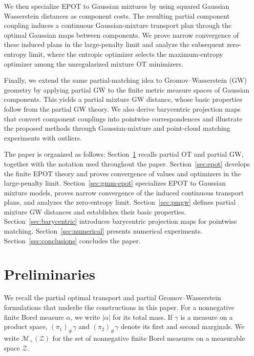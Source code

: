 \documentclass[a4paper,11pt]{article}
\numberwithin{equation}{section}
\newcommand{\MM}{\mathcal{M}}
\newcommand{\Z}{\mathcal{Z}}
\begin{document}
We then specialize EPOT to Gaussian mixtures by using squared Gaussian Wasserstein distances as component costs. The resulting partial component coupling induces a continuous Gaussian-mixture transport plan through the optimal Gaussian maps between components. We prove narrow convergence of these induced plans in the large-penalty limit and analyze the subsequent zero-entropy limit, where the entropic optimizer selects the maximum-entropy optimizer among the unregularized mixture OT minimizers.

Finally, we extend the same partial-matching idea to Gromov--Wasserstein (GW) geometry by applying partial GW to the finite metric measure spaces of Gaussian components. This yields a partial mixture GW distance, whose basic properties follow from the partial GW theory. We also derive barycentric projection maps that convert component couplings into pointwise correspondences and illustrate the proposed methods through Gaussian-mixture and point-cloud matching experiments with outliers.

The paper is organized as follows: Section~\ref{sec:preliminaries} recalls partial OT and partial GW, together with the notation used throughout the paper. Section~\ref{sec:epot} develops the finite EPOT theory and proves convergence of values and optimizers in the large-penalty limit. Section~\ref{sec:gmm-epot} specializes EPOT to Gaussian mixture models, proves narrow convergence of the induced continuous transport plans, and analyzes the zero-entropy limit. Section~\ref{sec:pmgw} defines partial mixture GW distances and establishes their basic properties. Section~\ref{sec:barycentric} introduces barycentric projection maps for pointwise matching. Section~\ref{sec:numerical} presents numerical experiments. Section~\ref{sec:conclusions} concludes the paper.


\section{Preliminaries}\label{sec:preliminaries}

We recall the partial optimal transport and partial Gromov--Wasserstein formulations that underlie the constructions in this paper. For a nonnegative finite Borel measure $\alpha$, we write $|\alpha|$ for its total mass. If $\gamma$ is a measure on a product space, $(\pi_1)_\#\gamma$ and $(\pi_2)_\#\gamma$ denote its first and second marginals. We write $\MM_+(\Z)$ for the set of nonnegative finite Borel measures on a measurable space $\Z$.
\end{document}

